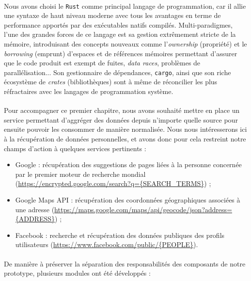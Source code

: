 \paragraph{} Nous avons choisi le \lstinline{Rust} \cite{Rust0} comme principal langage de programmation, car il allie une syntaxe
de haut niveau moderne avec tous les avantages en terme de performance apportés par des exécutables natifs compilés.
Multi-paradigmes, l'une des grandes forces de ce langage est sa gestion extrêmement stricte de la mémoire, introduisant
des concepts nouveaux comme l'\emph{ownership} (propriété) et le \emph{borrowing} (emprunt) d'espaces et de références 
mémoires permettant d'assurer que le code produit est exempt de fuites, \emph{data races}, problèmes de parallélisation...
Son gestionnaire de dépendances, \lstinline{cargo}, ainsi que son riche écosystème de \emph{crates} (bibliothèques) sont
à même de réconcilier les plus réfractaires avec les langages de programmation système.

\paragraph{} Pour accompagner ce premier chapitre, nous avons souhaité mettre en place un service permettant d'aggréger
des données depuis n'importe quelle source pour ensuite pouvoir les consommer de manière normalisée.
Nous nous intéresserons ici à la récupération de données personnelles, et avons donc pour cela restreint notre champs
d'action à quelques services pertinents :

\begin{itemize}
    \item Google : récupération des suggestions de pages liées à la personne concernée par le
    premier moteur de recherche mondial (\url{https://encrypted.google.com/search?q={SEARCH_TERMS}}) ;
    \item Google Maps API : récupération des coordonnées géographiques associées à une adresse
    (\url{https://maps.google.com/maps/api/geocode/json?address={ADDRESS}}) ;
    \item Facebook : recherche et récupération des données publiques des profils utilisateurs
    (\url{https://www.facebook.com/public/{PEOPLE}}).
\end{itemize}

\paragraph{} De manière à préserver la séparation des responsabilités des composants de notre prototype, plusieurs modules
ont été développés : 

